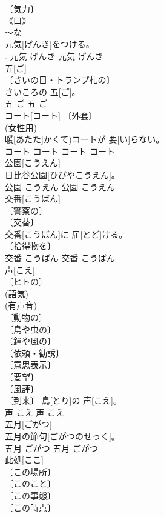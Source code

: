 \documentclass[8pt]{extreport}
\begin{document}
\begin{CJK}{UTF8}{min}
\\	〔気力〕 
\\	《口》 
\\	～な 
\\	元気[げんき]をつける。	
\\	[＝げんきづける].	元気	げんき	元気	げんき	
\\	五[ご]	
\\	〔さいの目・トランプ札の〕 
\\	さいころの 五[ご]。	
\\	五	ご	五	ご	
\\	コート[コート]	〔外套〕 
\\	(女性用) 
\\	暖[あたた]かくて)コートが 要[い]らない。	
\\	コート	コート	コート	コート	
\\	公園[こうえん]	
\\	日比谷公園[ひびやこうえん]。	
\\	公園	こうえん	公園	こうえん	
\\	交番[こうばん]	
\\	〔警察の〕 
\\	〔交替〕 
\\	交番[こうばん]に 届[とど]ける。	
\\	〔拾得物を〕 
\\	交番	こうばん	交番	こうばん	
\\	声[こえ]	
\\	〔ヒトの〕 
\\	(語気) 
\\	(有声音) 
\\	〔動物の〕 
\\	〔鳥や虫の〕 
\\	〔鐘や風の〕 
\\	〔依頼・勧誘〕 
\\	〔意思表示〕 
\\	〔要望〕 
\\	〔風評〕 
\\	〔到来〕	鳥[とり]の 声[こえ]。	
\\	声	こえ	声	こえ	
\\	五月[ごがつ]	
\\	五月の節句[ごがつのせっく]。	
\\	五月	ごがつ	五月	ごがつ	
\\	此処[ここ]	
\\	〔この場所〕 
\\	〔このこと〕 
\\	〔この事態〕 
\\	〔この時点〕 

\end{CJK}
\end{document}
